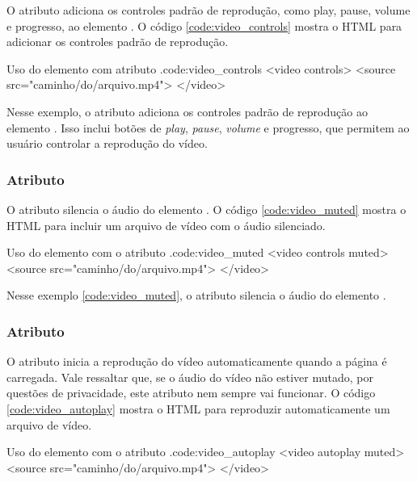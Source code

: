 O atributo  adiciona os controles padrão de reprodução, como play, pause, volume e progresso, ao elemento . O código \ref{code:video_controls} mostra o HTML para adicionar os controles padrão de reprodução.

\begin{htmlcode}{Uso do elemento  com atributo .}{code:video_controls}
<video controls>
  <source src="caminho/do/arquivo.mp4">
</video>
\end{htmlcode}

Nesse exemplo, o atributo  adiciona os controles padrão de reprodução ao elemento . Isso inclui botões de \textit{play}, \textit{pause}, \textit{volume} e progresso, que permitem ao usuário controlar a reprodução do vídeo.

\subsubsection{Atributo }

O atributo  silencia o áudio do elemento . O código \ref{code:video_muted} mostra o HTML para incluir um arquivo de vídeo com o áudio silenciado.

\begin{htmlcode}{Uso do elemento  com o atributo .}{code:video_muted}
<video controls muted>
  <source src="caminho/do/arquivo.mp4">
</video>
\end{htmlcode}

Nesse exemplo \ref{code:video_muted}, o atributo  silencia o áudio do elemento .

\subsubsection{Atributo }

O atributo  inicia a reprodução do vídeo automaticamente quando a página é carregada. Vale ressaltar que, se o áudio do vídeo não estiver mutado, por questões de privacidade, este atributo nem sempre vai funcionar. O código \ref{code:video_autoplay} mostra o HTML para reproduzir automaticamente um arquivo de vídeo.

\begin{htmlcode}{Uso do elemento  com o atributo .}{code:video_autoplay}
<video autoplay muted>
  <source src="caminho/do/arquivo.mp4">
</video>
\end{htmlcode}

